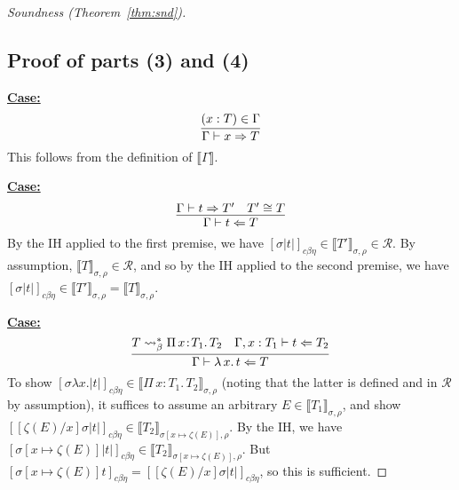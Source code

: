 \documentclass{article}
\newcommand{\choice}[0]{\zeta}
\newcommand{\abs}[4]{{#1}\, #2\! : \! #3.\, #4}
\newcommand{\absu}[3]{{#1}\, #2.\, #3}
\newcommand{\interp}[1]{\llbracket #1 \rrbracket}
\newcommand{\tpcheck}[0]{\Leftarrow}
\newcommand{\tpsynth}[0]{\Rightarrow}
\newcommand{\cbe}[0]{c\beta\eta}
\newcommand{\startcase}[1]{\vspace{#1} \noindent\textbf{\underline{Case:}}}
\begin{document}
\begin{proof}[Soundness (Theorem~\ref{thm:snd})]
\subsection{Proof of parts (3) and (4)}

\startcase{.2cm}
\[
    \infer{\Gamma\vdash x\tpsynth T}{(x : T)\in\Gamma} 
\]
This follows from the definition of $\interp{\Gamma}$.



\startcase{.2cm}
\[
  \infer{\Gamma\vdash t\tpcheck T}{\Gamma\vdash t\tpsynth T' & T' \cong T}
\]
By the IH applied to the first premise, we have 
$[\sigma|t|]_{\cbe}\in\interp{T'}_{\sigma,\rho}\in\mathcal{R}$. By assumption, $\interp{T}_{\sigma,\rho}\in\mathcal{R}$,
and so by the IH applied to the second premise, we have $[\sigma|t|]_{\cbe}\in\interp{T'}_{\sigma,\rho} = \interp{T}_{\sigma,\rho}$.

\startcase{.2cm}
\[
  \infer{\Gamma\vdash \absu{\lambda}{x}{t} \tpcheck T}{T \leadsto_\beta^* \abs{\Pi}{x}{T_1}{T_2} & \Gamma,x:T_1\vdash t\tpcheck T_2}
\]
To show $[\sigma \lambda
x.|t|]_{\cbe}\in\interp{\abs{\Pi}{x}{T_1}{T_2}}_{\sigma,\rho}$ (noting that the
latter is defined and in $\mathcal{R}$ by assumption), it suffices to assume an
arbitrary $E\in\interp{T_1}_{\sigma,\rho}$, and show
$[[\choice(E)/x]\sigma|t|]_{\cbe}\in\interp{T_2}_{\sigma[x\mapsto\choice(E)],\rho}$.
By the IH, we have
$[\sigma[x\mapsto\choice(E)]|t|]_{\cbe}\in\interp{T_2}_{\sigma[x\mapsto\choice(E)],\rho}$.
But $[\sigma[x\mapsto\choice(E)]t]_{\cbe} = [[\choice(E)/x]\sigma|t|]_{\cbe}$,
so this is sufficient.


\end{proof}
\end{document}
